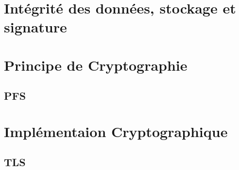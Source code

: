 \documentclass[twoside,a4paper,12pt,titlepage]{book}
\begin{document}
\section{Intégrité des données, stockage et signature}

\section{Principe de Cryptographie}
\subsection{PFS}

\section{Implémentaion Cryptographique}
\subsection{TLS}
\end{document}
